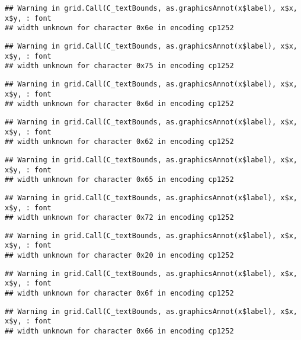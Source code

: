 \documentclass[
]{article}
\begin{document}
\begin{verbatim}
## Warning in grid.Call(C_textBounds, as.graphicsAnnot(x$label), x$x, x$y, : font
## width unknown for character 0x6e in encoding cp1252
\end{verbatim}

\begin{verbatim}
## Warning in grid.Call(C_textBounds, as.graphicsAnnot(x$label), x$x, x$y, : font
## width unknown for character 0x75 in encoding cp1252
\end{verbatim}

\begin{verbatim}
## Warning in grid.Call(C_textBounds, as.graphicsAnnot(x$label), x$x, x$y, : font
## width unknown for character 0x6d in encoding cp1252
\end{verbatim}

\begin{verbatim}
## Warning in grid.Call(C_textBounds, as.graphicsAnnot(x$label), x$x, x$y, : font
## width unknown for character 0x62 in encoding cp1252
\end{verbatim}

\begin{verbatim}
## Warning in grid.Call(C_textBounds, as.graphicsAnnot(x$label), x$x, x$y, : font
## width unknown for character 0x65 in encoding cp1252
\end{verbatim}

\begin{verbatim}
## Warning in grid.Call(C_textBounds, as.graphicsAnnot(x$label), x$x, x$y, : font
## width unknown for character 0x72 in encoding cp1252
\end{verbatim}

\begin{verbatim}
## Warning in grid.Call(C_textBounds, as.graphicsAnnot(x$label), x$x, x$y, : font
## width unknown for character 0x20 in encoding cp1252
\end{verbatim}

\begin{verbatim}
## Warning in grid.Call(C_textBounds, as.graphicsAnnot(x$label), x$x, x$y, : font
## width unknown for character 0x6f in encoding cp1252
\end{verbatim}

\begin{verbatim}
## Warning in grid.Call(C_textBounds, as.graphicsAnnot(x$label), x$x, x$y, : font
## width unknown for character 0x66 in encoding cp1252
\end{verbatim}
\end{document}
